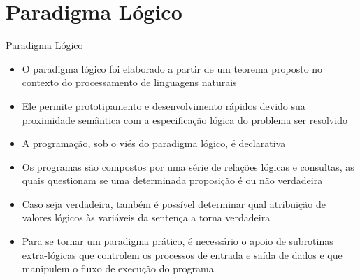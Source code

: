 \section{Paradigma Lógico}


\begin{frame}[fragile]{Paradigma Lógico}

    \begin{itemize}
        \item O paradigma lógico foi elaborado a partir de um teorema proposto no contexto
            do processamento de linguagens naturais

        \item Ele permite prototipamento e desenvolvimento rápidos devido sua proximidade
            semântica com a especificação lógica do problema ser resolvido

        \item A programação, sob o viés do paradigma lógico, é declarativa

        \item Os programas são compostos por uma série de relações lógicas e consultas, as
            quais questionam se uma determinada proposição é ou não verdadeira

        \item Caso seja verdadeira, também é possível determinar qual atribuição de valores
            lógicos às variáveis da sentença a torna verdadeira

        \item Para se tornar um paradigma prático, é necessário o apoio de subrotinas
            extra-lógicas que controlem os processos de entrada e saída de dados e que 
            manipulem o fluxo de execução do programa
    \end{itemize}

\end{frame}

